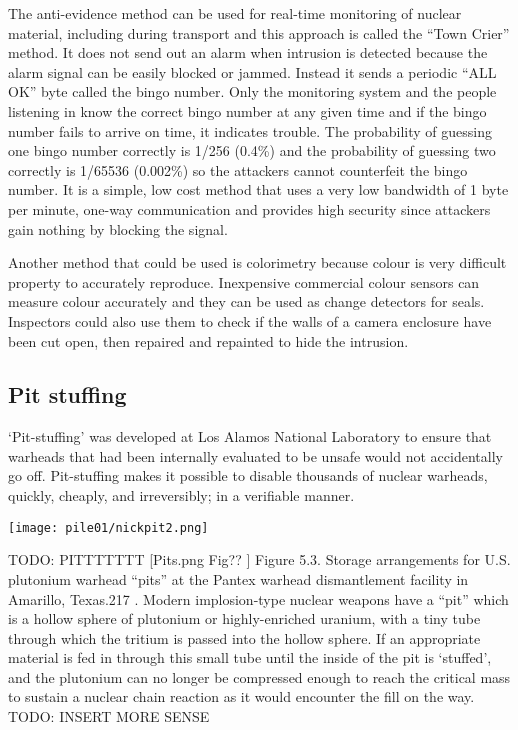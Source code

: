 \documentclass[twoside,titlepage,11pt,twocolumn,a4paper]{article}
\begin{document}
The anti-evidence method can be used for real-time monitoring of
nuclear material, including during transport and this approach is
called the ``Town Crier'' method. It does not send out an alarm when
intrusion is detected because the alarm signal can be easily blocked
or jammed. Instead it sends a periodic ``ALL OK'' byte called the
bingo number. Only the monitoring system and the people listening in
know the correct bingo number at any given time and if the bingo
number fails to arrive on time, it indicates trouble. The probability
of guessing one bingo number correctly is 1/256 (0.4\%) and the
probability of guessing two correctly is 1/65536 (0.002\%) so the
attackers cannot counterfeit the bingo number. It is a simple, low
cost method that uses a very low bandwidth of 1 byte per minute,
one-way communication and provides high security since attackers gain
nothing by blocking the signal. \citep{unconventionalCoC2010}

Another method that could be used is colorimetry because colour is
very difficult property to accurately reproduce. Inexpensive
commercial colour sensors can measure colour accurately and they can
be used as change detectors for seals. Inspectors could also use them
to check if the walls of a camera enclosure have been cut open, then
repaired and repainted to hide the
intrusion. \citep{unconventionalCoC2010}

\subsection{Pit stuffing}
`Pit-stuffing' was developed at Los Alamos National Laboratory 
to ensure that warheads that had been internally evaluated to be 
unsafe would not accidentally go off. Pit-stuffing makes it possible
to disable thousands of nuclear warheads, quickly, cheaply, and 
irreversibly; in a verifiable manner.

\begin{figure*}
  \texttt{[image: pile01/nickpit2.png]}
\end{figure*}

TODO: PITTTTTTT
[Pits.png Fig?? ] Figure 5.3. Storage arrangements for U.S. plutonium
warhead ``pits'' at the Pantex warhead dismantlement facility in
Amarillo, Texas.217 \citep{IPFN2009}. Modern
implosion-type nuclear weapons have a ``pit'' which is a hollow sphere
of plutonium or highly-enriched uranium, with a tiny tube through
which the tritium is passed into the hollow sphere. If an appropriate
material is fed in through this small tube until the inside of the pit
is ‘stuffed’, and the plutonium can no longer be compressed enough to
reach the critical mass to sustain a nuclear chain reaction as it
would encounter the fill on the way.
TODO: INSERT MORE SENSE
\end{document}

